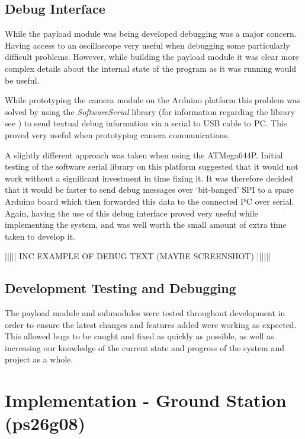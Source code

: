 \section{Debug Interface}
\label{sec:payload_debug_interface}
While the payload module was being developed debugging was a major concern. 
Having access to an oscilloscope very useful when debugging some particularly 
difficult problems.
However, while building the payload module it was clear more complex details 
about the internal state of the program as it was running would be useful.

While prototyping the camera module on the Arduino platform this problem was 
solved by using the \emph{SoftwareSerial} library (for information regarding 
the library see \cite{software_serial}) to send textual debug information via
a serial to USB cable to PC. This proved very useful when prototyping camera
communications.

A slightly different approach was taken when using the ATMega644P. Initial 
testing of the software serial library on this platform suggested that it 
would not work without a significant investment in time fixing it. It was
therefore decided that it would be faster to send debug messages over 
`bit-banged' SPI to a spare Arduino board which then forwarded this data to 
the connected PC over serial. Again, having the use of this debug interface 
proved very useful while implementing the system, and was well worth the 
small amount of extra time taken to develop it.

||||| INC EXAMPLE OF DEBUG TEXT (MAYBE SCREENSHOT) ||||||

\section{Development Testing and Debugging}
The payload module and submodules were tested throughout development in order 
to ensure the latest changes and features added were working as expected. 
This allowed bugs to be caught and fixed as quickly as possible, as well as
increasing our knowledge of the current state and progress of the system and
project as a whole.



\chapter{Implementation - Ground Station (ps26g08)}






